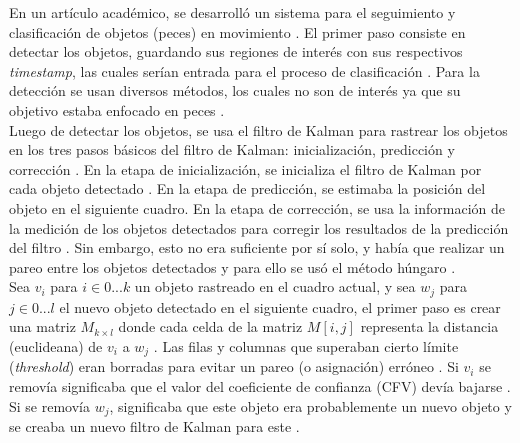\documentclass[a4paper,openright,12pt]{report}
\begin{document}
En un artículo académico, se desarrolló un sistema para el seguimiento y
clasificación de objetos (peces) en movimiento \cite{szHucs2015svm}. El primer
paso consiste en detectar los objetos, guardando sus regiones de interés con sus
respectivos \textit{timestamp}, las cuales serían entrada para el proceso de
clasificación \cite{szHucs2015svm}. Para la detección se usan diversos métodos,
los cuales no son de interés ya que su objetivo estaba enfocado en peces
\cite{szHucs2015svm}.\\

Luego de detectar los objetos, se usa el filtro de Kalman para rastrear los
objetos en los tres pasos básicos del filtro de Kalman: inicialización,
predicción y corrección \cite{szHucs2015svm}. En la etapa de inicialización,
se inicializa el filtro de Kalman por cada objeto detectado
\cite{szHucs2015svm}. En la etapa de predicción, se estimaba la posición del
objeto en el siguiente cuadro. En la etapa de corrección, se usa la información
de la medición de los objetos detectados para corregir los resultados de la
predicción del filtro \cite{szHucs2015svm}. Sin embargo, esto no era suficiente
por sí solo, y había que realizar un pareo entre los objetos detectados y para
ello se usó el método húngaro \cite{szHucs2015svm}.\\

Sea $v_{i}$ para $i \in 0...k$ un objeto rastreado en el cuadro actual, y sea
$w_{j}$ para $j \in 0...l$ el nuevo objeto detectado en el siguiente cuadro, el
primer paso es crear una matriz $M_{k \times l}$ donde cada celda de la matriz
$M[i,j]$ representa la distancia (euclideana) de $v_{i}$ a $w_{j}$
\cite{szHucs2015svm}. Las filas y columnas que superaban cierto límite
(\textit{threshold}) eran borradas para evitar un pareo (o asignación) erróneo
\cite{szHucs2015svm}. Si $v_{i}$ se removía significaba que el valor del
coeficiente de confianza (CFV) devía bajarse \cite{szHucs2015svm}. Si se removía
$w_{j}$, significaba que este objeto era probablemente un nuevo objeto y se
creaba un nuevo filtro de Kalman para este \cite{szHucs2015svm}.\\
\end{document}
